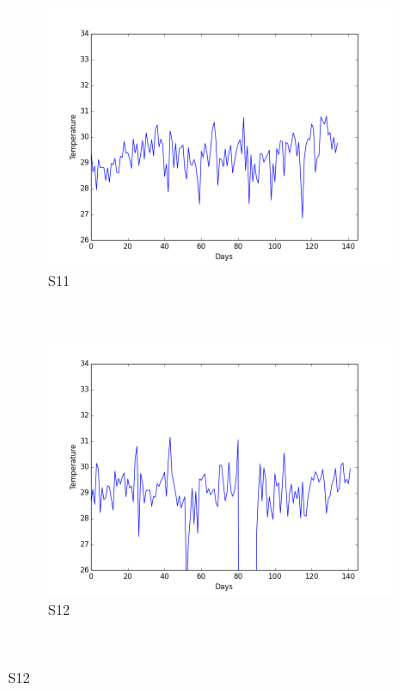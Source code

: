 \documentclass[12pt]{article} %
\begin{document}
\begin{figure}[H]
    \centering
    \begin{subfigure}[b]{0.30\textwidth}
        \includegraphics[width=\textwidth]{img/graphs/11-airtemp-1}
        \caption{S11}
        \label{fig:s11AT}
    \end{subfigure}
    ~ %
    \begin{subfigure}[b]{0.30\textwidth}
        \includegraphics[width=\textwidth]{img/graphs/12-airtemp-1}
        \caption{S12}
        \label{fig:s12AT}
    \end{subfigure}
    ~ %

\end{figure}
\end{document}
